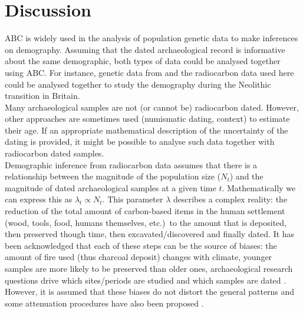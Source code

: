 \documentclass[a4paper]{article}
\begin{document}
\section*{\centering Discussion}




ABC is widely used in the analysis of population genetic data to make inferences on demography. Assuming that the dated archaeological record is informative about the same demographic, both types of data could be analysed together using ABC. For instance, genetic data from \parencite[][]{Patterson2022} and the radiocarbon data used here \parencite{Bevan2017a} could be analysed together to study the demography during the Neolithic transition in Britain. 
\\


Many archaeological samples are not (or cannot be) radiocarbon dated. However, other approaches are sometimes used (numismatic dating, context) to estimate their age. If an appropriate mathematical description of the uncertainty of the dating is provided, it might be possible to analyse such data together with radiocarbon dated samples.
\\


Demographic inference from radiocarbon data assumes that there is a relationship between the magnitude of the population size ($N_t$) and the magnitude of dated archaeological samples at a given time $t$. Mathematically we can express this as $\lambda_t \propto N_t$. This parameter $\lambda$ describes a complex reality: the reduction of the total amount of carbon-based items in the human settlement (wood, tools, food, humans themselves, etc.)\ to the amount that is deposited, then preserved though time, then excavated/discovered and finally dated. It has been acknowledged that each of these steps can be the source of biases: the amount of fire used (thus charcoal deposit) changes with climate, younger samples are more likely to be preserved than older ones, archaeological research questions drive which sites/periods are studied and which samples are dated \parencite{Rick1987,Williams2012}. However, it is assumed that these biases do not distort the general patterns and some attenuation procedures have also been proposed \textcite[\emph{e.g.}\ binning][]{Shennan2013}.
\\



\end{document}
